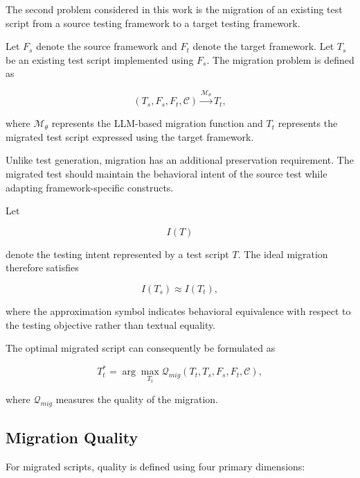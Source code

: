 \documentclass[pdflatex,sn-mathphys-num]{sn-jnl}
\begin{document}
The second problem considered in this work is the migration of an existing
test script from a source testing framework to a target testing framework.

Let $F_s$ denote the source framework and $F_t$ denote the target framework.
Let $T_s$ be an existing test script implemented using $F_s$. The migration
problem is defined as

\begin{equation}
    (T_s,F_s,F_t,\mathcal{C})
    \xrightarrow{\mathcal{M}_{\theta}}
    T_t ,
\label{eq:migration}
\end{equation}

where $\mathcal{M}_{\theta}$ represents the LLM-based migration function and
$T_t$ represents the migrated test script expressed using the target
framework.

Unlike test generation, migration has an additional preservation
requirement. The migrated test should maintain the behavioral intent of the
source test while adapting framework-specific constructs.

Let

\begin{equation}
    I(T)
\end{equation}

denote the testing intent represented by a test script $T$. The ideal
migration therefore satisfies

\begin{equation}
    I(T_s) \approx I(T_t),
\label{eq:intent-preservation}
\end{equation}

where the approximation symbol indicates behavioral equivalence with
respect to the testing objective rather than textual equality.

The optimal migrated script can consequently be formulated as

\begin{equation}
    T_t^{*}
    =
    \arg\max_{T_t}
    \mathcal{Q}_{mig}
    (T_t,T_s,F_s,F_t,\mathcal{C}),
\label{eq:migration-objective}
\end{equation}

where $\mathcal{Q}_{mig}$ measures the quality of the migration.

\subsection{Migration Quality}

For migrated scripts, quality is defined using four primary dimensions:
\end{document}
